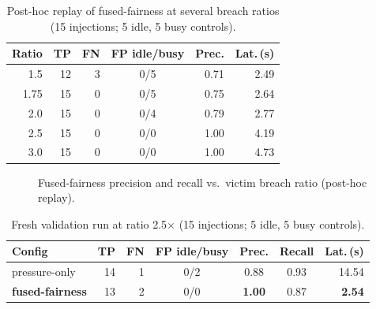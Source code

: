 \documentclass[conference]{IEEEtran}
\begin{document}
\begin{table}[t]
\caption{Post-hoc replay of fused-fairness at several breach ratios (15 injections; 5 idle, 5 busy controls).}
\label{tab:thr}
\centering
\begin{tabular}{rrrcrr}
\toprule
Ratio & TP & FN & FP idle/busy & Prec. & Lat.\,(s)\\
\midrule
1.5 & 12 & 3 & 0/5 & 0.71 & 2.49\\
1.75 & 15 & 0 & 0/5 & 0.75 & 2.64\\
2.0 & 15 & 0 & 0/4 & 0.79 & 2.77\\
2.5 & 15 & 0 & 0/0 & 1.00 & 4.19\\
3.0 & 15 & 0 & 0/0 & 1.00 & 4.73\\
\bottomrule
\end{tabular}
\end{table}

\begin{figure}[t]
\centering
{}
\caption{Fused-fairness precision and recall vs.\ victim breach ratio (post-hoc replay).}
\label{fig:thr}
\end{figure}

\begin{table}[t]
\caption{Fresh validation run at ratio 2.5$\times$ (15 injections; 5 idle, 5 busy controls).}
\label{tab:val}
\centering
\setlength{\tabcolsep}{3pt}
\begin{tabular}{lrrcccr}
\toprule
Config & TP & FN & FP idle/busy & Prec. & Recall & Lat.\,(s)\\
\midrule
pressure-only & 14 & 1 & 0/2 & 0.88 & 0.93 & 14.54\\
\textbf{fused-fairness} & 13 & 2 & 0/0 & \textbf{1.00} & 0.87 & \textbf{2.54}\\
\bottomrule
\end{tabular}
\end{table}
\end{document}
